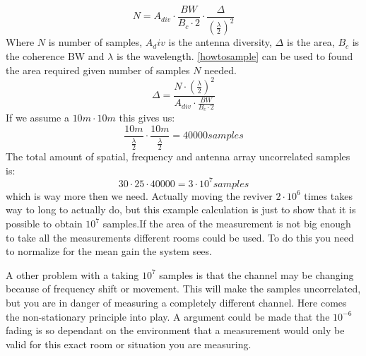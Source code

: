 \begin{equation}
N = A_{div} \cdot \frac{BW}{B_c \cdot 2} \cdot \frac{\Delta}{(\frac{\lambda}{2})^2}
\label{howtosample}
\end{equation} 
Where $N$ is number of samples, $A_div$ is the antenna diversity, $\Delta$ is the area, $B_c$ is the coherence BW and $\lambda$ is the wavelength.
\autoref{howtosample} can be used to found the area required given number of samples $N$ needed.
\begin{equation}
\Delta  = \frac{N\cdot (\frac{\lambda}{2})^2}{A_{div}\cdot \frac{BW}{B_c \cdot 2}}
\label{howtosqaure}
\end{equation}
If we assume a $10m \cdot 10m$ this gives us: 
\begin{equation}
\frac{10m}{\frac{\lambda}{2}} \cdot \frac{10m}{\frac{\lambda}{2}}  = 40000 samples
\end{equation}
The total amount of spatial, frequency and antenna array uncorrelated samples is:
\begin{equation}
30 \cdot 25 \cdot 40000 = 3 \cdot 10^7 samples
\end{equation}
which is way more then we need.
Actually moving the reviver $2 \cdot 10^6$ times takes way to long to actually do, but this example calculation is just to show that it is possible to obtain $10^7$ samples.If the area of the measurement is not big enough to take all the measurements different rooms could be used. To do this you need to normalize for the mean gain the system sees. 

A other problem with a taking $10^7$ samples is that the channel may be changing because of frequency shift or movement. This will make the samples uncorrelated, but you are in danger of measuring a completely different channel. Here comes the non-stationary principle into play. A argument could be made that the $10^{-6}$ fading is so dependant on the environment that a measurement would only be valid for this exact room or situation you are measuring.


